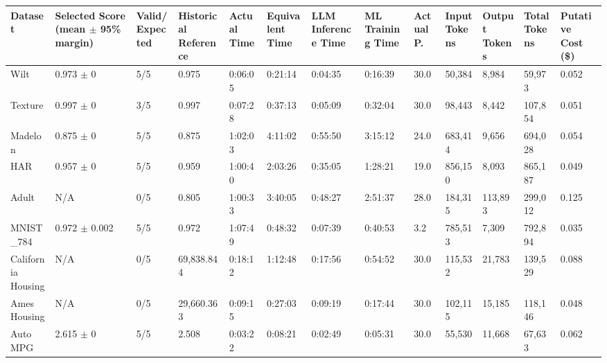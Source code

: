 \begin{tabular}{lllllllllllll}
\hline
Dataset & Selected Score (mean \ensuremath{\pm} 95\% margin) & Valid/Expected & Historical Reference & Actual Time & Equivalent Time & LLM Inference Time & ML Training Time & Actual P. & Input Tokens & Output Tokens & Total Tokens & Putative Cost (\$) \\
\hline
Wilt & 0.973 \ensuremath{\pm} 0 & 5/5 & 0.975 & 0:06:05 & 0:21:14 & 0:04:35 & 0:16:39 & 30.0 & 50,384 & 8,984 & 59,973 & 0.052 \\
Texture & 0.997 \ensuremath{\pm} 0 & 3/5 & 0.997 & 0:07:28 & 0:37:13 & 0:05:09 & 0:32:04 & 30.0 & 98,443 & 8,442 & 107,854 & 0.051 \\
Madelon & 0.875 \ensuremath{\pm} 0 & 5/5 & 0.875 & 1:02:03 & 4:11:02 & 0:55:50 & 3:15:12 & 24.0 & 683,414 & 9,656 & 694,028 & 0.054 \\
HAR & 0.957 \ensuremath{\pm} 0 & 5/5 & 0.959 & 1:00:40 & 2:03:26 & 0:35:05 & 1:28:21 & 19.0 & 856,150 & 8,093 & 865,187 & 0.049 \\
Adult & N/A & 0/5 & 0.805 & 1:00:33 & 3:40:05 & 0:48:27 & 2:51:37 & 28.0 & 184,315 & 113,893 & 299,012 & 0.125 \\
MNIST\_784 & 0.972 \ensuremath{\pm} 0.002 & 5/5 & 0.972 & 1:07:49 & 0:48:32 & 0:07:39 & 0:40:53 & 3.2 & 785,513 & 7,309 & 792,894 & 0.035 \\
California Housing & N/A & 0/5 & 69,838.844 & 0:18:12 & 1:12:48 & 0:17:56 & 0:54:52 & 30.0 & 115,532 & 21,783 & 139,529 & 0.088 \\
Ames Housing & N/A & 0/5 & 29,660.363 & 0:09:15 & 0:27:03 & 0:09:19 & 0:17:44 & 30.0 & 102,115 & 15,185 & 118,146 & 0.048 \\
Auto MPG & 2.615 \ensuremath{\pm} 0 & 5/5 & 2.508 & 0:03:22 & 0:08:21 & 0:02:49 & 0:05:31 & 30.0 & 55,530 & 11,668 & 67,633 & 0.062 \\
\hline
\end{tabular}
